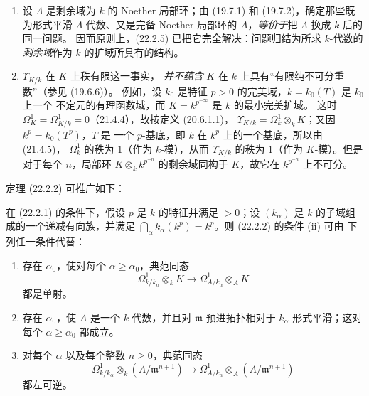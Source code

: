 \begin{remarks}[22.2.7]
\label{0.22.2.7-fr}
\begin{enumerate}
  \item[(i)] 设 $\Lambda$ 是剩余域为 $k$ 的 Noether 局部环；由
  (19.7.1) 和 (19.7.2)，确定那些既为形式平滑 $\Lambda$-代数、又是完备
  Noether 局部环的 $A$，\emph{等价于}把 $\Lambda$ 换成 $k$ 后的同一问题。
  因而原则上，(22.2.5) 已把它完全解决：问题归结为所求 $k$-代数的
  \emph{剩余域}作为 $k$ 的扩域所具有的结构。

  \item[(ii)] $\Upsilon_{K/k}$ 在 $K$ 上秩有限这一事实，
  \emph{并不蕴含} $K$ 在 $k$ 上具有“有限纯不可分重数”（参见 (19.6.6)）。
  例如，设 $k_0$ 是特征 $p>0$ 的完美域，$k=k_0(T)$ 是 $k_0$ 上一个
  不定元的有理函数域，而 $K=k^{p^{-\infty}}$ 是 $k$ 的最小完美扩域。
  这时 $\Omega^1_K=\Omega^1_{K/k}=0$（21.4.4），故按定义 (20.6.1.1)，
  $\Upsilon_{K/k}=\Omega^1_k\otimes_kK$；又因 $k^p=k_0(T^p)$，$T$ 是
  一个 $p$-基底，即 $k$ 在 $k^p$ 上的一个基底，所以由 (21.4.5)，
  $\Omega^1_k$ 的秩为 $1$（作为 $k$-模），从而 $\Upsilon_{K/k}$ 的秩为
  $1$（作为 $K$-模）。但是对于每个
  $n$，局部环 $K\otimes_kk^{p^{-n}}$ 的剩余域同构于 $K$，故它在
  $k^{p^{-n}}$ 上不可分。
\end{enumerate}
\end{remarks}

定理 (22.2.2) 可推广如下：

\begin{proposition}[22.2.8]
\label{0.22.2.8-fr}
在 (22.2.1) 的条件下，假设 $p$ 是 $k$ 的特征并满足 $>0$；设
$(k_\alpha)$ 是 $k$ 的子域组成的一个递减有向族，并满足
$\bigcap_\alpha k_\alpha(k^p)=k^p$。则 (22.2.2) 的条件 (ii) 可由
下列任一条件代替：
\begin{enumerate}
  \item[a)] 存在 $\alpha_0$，使对每个
  $\alpha\geqslant\alpha_0$，典范同态
  \[
    \Omega^1_{k/k_\alpha}\otimes_kK
    \longrightarrow\Omega^1_{A/k_\alpha}\otimes_AK
  \]
  都是单射。
  \item[b)] 存在 $\alpha_0$，使 $A$ 是一个 $k$-代数，并且对
  $\mathfrak m$-预进拓扑相对于 $k_\alpha$ 形式平滑；这对每个
  $\alpha\geqslant\alpha_0$ 都成立。
  \item[c)] 对每个 $\alpha$ 以及每个整数 $n\geqslant0$，典范同态
  \[
    \Omega^1_{k/k_\alpha}\otimes_k(A/\mathfrak m^{n+1})
    \longrightarrow
    \Omega^1_{A/k_\alpha}\otimes_A(A/\mathfrak m^{n+1})
  \]
  都左可逆。
\end{enumerate}
\end{proposition}

